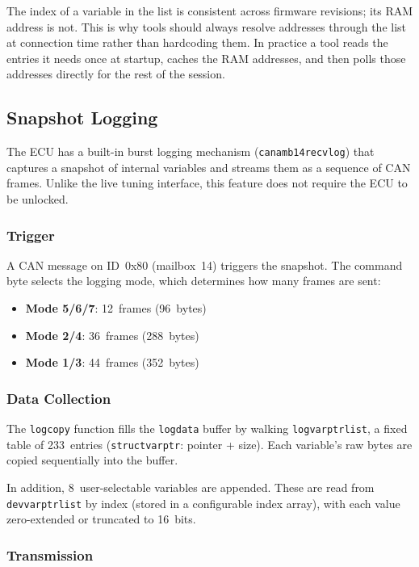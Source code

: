 \documentclass[a4paper,11pt]{article}
\renewcommand{\_}{\oldunderscore\allowbreak}
\begin{document}
The index of a variable in the list is consistent across firmware revisions;
its RAM address is not. This is why tools should always resolve addresses
through the list at connection time rather than hardcoding them. In practice
a tool reads the entries it needs once at startup, caches the RAM addresses,
and then polls those addresses directly for the rest of the session.

\subsection{Snapshot Logging}

The ECU has a built-in burst logging mechanism
(\texttt{can\_a\_mb14\_recv\_log}) that captures a snapshot of internal
variables and streams them as a sequence of CAN frames. Unlike the live tuning
interface, this feature does not require the ECU to be unlocked.

\subsubsection*{Trigger}

A CAN message on ID~0x80 (mailbox~14) triggers the snapshot. The command
byte selects the logging mode, which determines how many frames are sent:

\begin{itemize}
\item \textbf{Mode 5/6/7}: 12~frames (96~bytes)
\item \textbf{Mode 2/4}: 36~frames (288~bytes)
\item \textbf{Mode 1/3}: 44~frames (352~bytes)
\end{itemize}

\subsubsection*{Data Collection}

The \texttt{log\_copy} function fills the \texttt{log\_data} buffer by walking
\texttt{log\_varptr\_list}, a fixed table of 233~entries
(\texttt{struct\_varptr}: pointer + size). Each variable's raw bytes are copied
sequentially into the buffer.

In addition, 8~user-selectable variables are appended. These are read from
\texttt{dev\_varptr\_list} by index (stored in a configurable index array),
with each value zero-extended or truncated to 16~bits.

\subsubsection*{Transmission}
\end{document}
